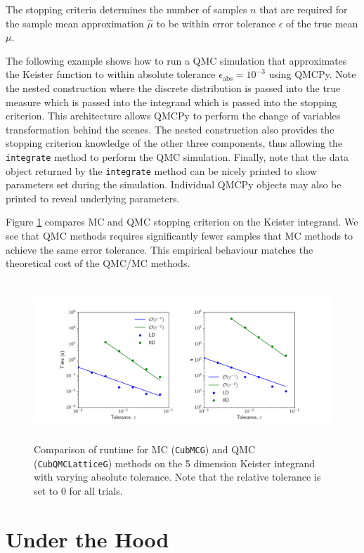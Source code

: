 \documentclass[graybox,footinfo]{svmult}
\begin{document}
The stopping criteria determines the number of samples $n$ that are required for the sample mean approximation $\hat{\mu}$ to be within error tolerance $\epsilon$ of the true mean $\mu$. 

The following example shows how to run a QMC simulation that approximates the Keister function to within absolute tolerance $\epsilon_{\text{abs}}=10^{-3}$ using QMCPy. Note the nested construction where the discrete distribution is passed into the true measure which is passed into the integrand which is passed into the stopping criterion. This architecture allows QMCPy to perform the change of variables transformation behind the scenes. The nested construction also provides the stopping criterion knowledge of the other three components, thus allowing the \texttt{integrate} method to perform the QMC simulation. Finally, note that the data object returned by the \texttt{integrate} method can be nicely printed to show parameters set during the simulation. Individual QMCPy objects may also be printed to reveal underlying parameters. 


Figure \ref{fig:sc_comp} compares MC and QMC stopping criterion on the Keister integrand. We see that QMC methods requires significantly fewer samples that MC methods to achieve the same error tolerance. This empirical behaviour matches the theoretical cost of the QMC/MC methods.

\begin{figure}
	\includegraphics[height=6cm]{ags/figs/sc.comp.png}
	\caption{Comparison of runtime for MC (\texttt{CubMCG}) and QMC (\texttt{CubQMCLatticeG}) methods on the 5 dimension Keister integrand with varying absolute tolerance. Note that the relative tolerance is set to 0 for all trials. }
	\label{fig:sc_comp}
\end{figure}

\section{Under the Hood}
\end{document}
